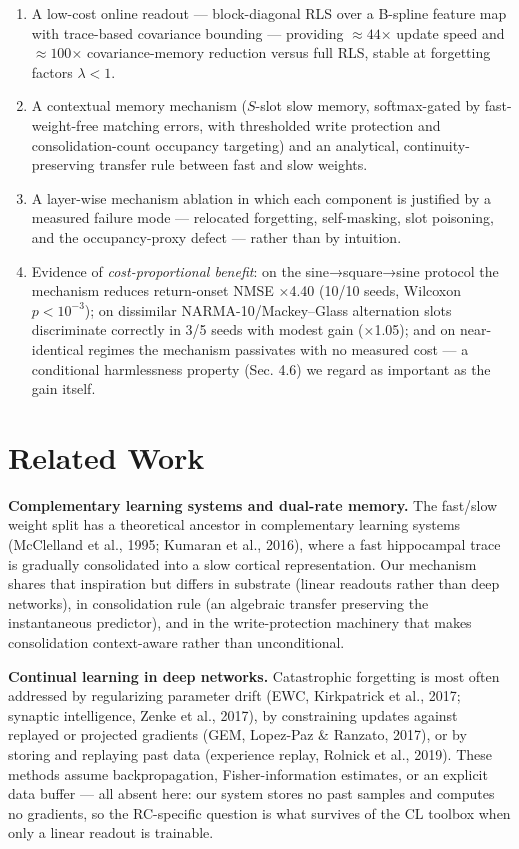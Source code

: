 \documentclass[11pt]{article}
\providecommand{\tightlist}{\setlength{\itemsep}{0pt}%
  \setlength{\parskip}{0pt}}
\begin{document}
\begin{enumerate}
\def\labelenumi{\arabic{enumi}.}
\tightlist
\item
  A low-cost online readout --- block-diagonal RLS over a B-spline
  feature map with trace-based covariance bounding --- providing
  \(\approx 44\)× update speed and \(\approx 100\)× covariance-memory
  reduction versus full RLS, stable at forgetting factors \(\lambda<1\).
\item
  A contextual memory mechanism (\(S\)-slot slow memory, softmax-gated
  by fast-weight-free matching errors, with thresholded write
  protection and consolidation-count occupancy targeting) and an
  analytical, continuity-preserving transfer rule between fast and
  slow weights.
\item
  A layer-wise mechanism ablation in which each component is
  justified by a measured failure mode --- relocated forgetting,
  self-masking, slot poisoning, and the occupancy-proxy defect ---
  rather than by intuition.
\item
  Evidence of \emph{cost-proportional benefit}: on the
  sine→square→sine protocol the mechanism reduces return-onset
  NMSE ×4.40 (10/10 seeds, Wilcoxon \(p<10^{-3}\)); on
  dissimilar NARMA-10/Mackey--Glass alternation slots discriminate
  correctly in 3/5 seeds with modest gain (×1.05); and on
  near-identical regimes the mechanism passivates with no measured
  cost --- a conditional harmlessness property (Sec. 4.6) we
  regard as important as the gain itself.
\end{enumerate}

\section{Related Work}\label{related-work}

\textbf{Complementary learning systems and dual-rate memory.} The
fast/slow weight split has a theoretical ancestor in complementary
learning systems (McClelland et al., 1995; Kumaran et al., 2016),
where a fast hippocampal trace is gradually consolidated into a slow
cortical representation. Our mechanism shares that inspiration but
differs in substrate (linear readouts rather than deep networks),
in consolidation rule (an algebraic transfer preserving the
instantaneous predictor), and in the write-protection machinery that
makes consolidation context-aware rather than unconditional.

\textbf{Continual learning in deep networks.} Catastrophic forgetting is
most often addressed by regularizing parameter drift (EWC,
Kirkpatrick et al., 2017; synaptic intelligence, Zenke et al., 2017),
by constraining updates against replayed or projected gradients
(GEM, Lopez-Paz \& Ranzato, 2017), or by storing and replaying past
data (experience replay, Rolnick et al., 2019). These methods assume
backpropagation, Fisher-information estimates, or an explicit data
buffer --- all absent here: our system stores no past samples and
computes no gradients, so the RC-specific question is what survives
of the CL toolbox when only a linear readout is trainable.
\end{document}
